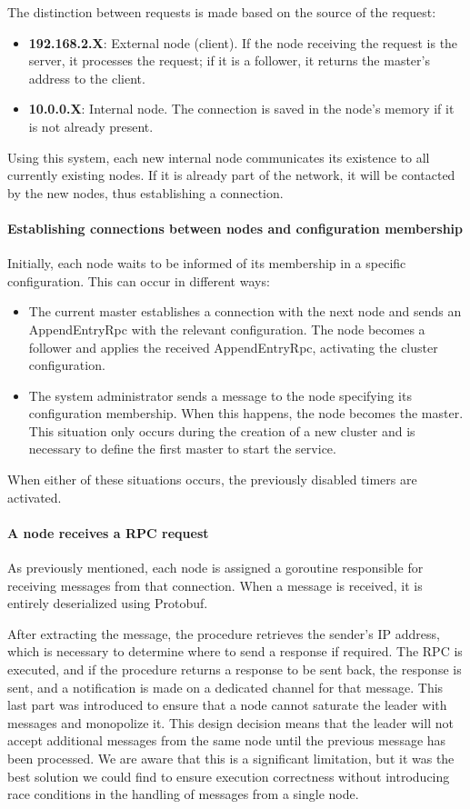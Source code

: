 The distinction between requests is made based on the source of the request:
\begin{itemize}
  \item \textbf{192.168.2.X}: External node (client). If the node receiving the request is 
    the server, it processes the request; if it is a follower, it returns the master's 
    address to the client.
  \item \textbf{10.0.0.X}: Internal node. The connection is saved in the node's memory 
    if it is not already present.
\end{itemize}
Using this system, each new internal node communicates its existence to all currently 
existing nodes. If it is already part of the network, it will be contacted by the new nodes, 
thus establishing a connection.

\paragraph{Establishing connections between nodes and configuration membership}
Initially, each node waits to be informed of its membership in a specific configuration. 
This can occur in different ways:
\begin{itemize}
  \item The current master establishes a connection with the next node and sends an 
    AppendEntryRpc with the relevant configuration. The node becomes a follower and 
    applies the received AppendEntryRpc, activating the cluster configuration.
  \item The system administrator sends a message to the node specifying its 
    configuration membership. When this happens, the node becomes the master. 
    This situation only occurs during the creation of a new cluster and is necessary 
    to define the first master to start the service.
\end{itemize}
When either of these situations occurs, the previously disabled timers are activated.

\paragraph{A node receives a RPC request}
As previously mentioned, each node is assigned a goroutine responsible for receiving 
messages from that connection. When a message is received, it is entirely deserialized 
using Protobuf.

After extracting the message, the procedure retrieves the sender's IP address, which 
is necessary to determine where to send a response if required. The RPC is executed, 
and if the procedure returns a response to be sent back, the response is sent, and a 
notification is made on a dedicated channel for that message.
This last part was introduced to ensure that a node cannot saturate the leader with 
messages and monopolize it. This design decision means that the leader will not accept 
additional messages from the same node until the previous message has been processed. 
We are aware that this is a significant limitation, but it was the best solution we 
could find to ensure execution correctness without introducing race conditions in the 
handling of messages from a single node.

